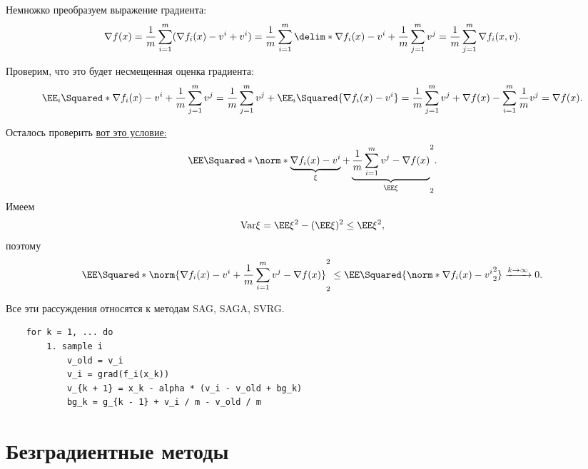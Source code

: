 Немножко преобразуем выражение градиента:
\begin{equation*}
    \nabla f(x) = \frac{1}{m}\sum_{i = 1}^m (\nabla f_i(x) - v^i + v^i) = \frac{1}{m}\sum_{i = 1}^m \delim*{\nabla f_i(x) - v^i + \frac{1}{m}\sum_{j = 1}^m v^j} = \frac{1}{m} \sum_{j = 1}^m \nabla f_i(x, v).
\end{equation*}

Проверим, что это будет несмещенная оценка градиента:
\begin{equation*}
    \EE_i \Squared*{\nabla f_i(x) - v^i + \frac{1}{m}\sum_{j = 1}^m v^j} = \frac{1}{m}\sum_{j = 1}^m v^j + \EE_i \Squared{\nabla f_i (x) - v^i} = \frac{1}{m}\sum_{j = 1}^m v^j + \nabla f(x) - \sum_{i = 1}^m \frac{1}{m}v^j = \nabla f(x).
\end{equation*}

Осталось проверить \hyperref[conv-cond]{вот это условие:}
\begin{equation*}
    \EE \Squared*{\norm*{\underbrace{\nabla f_i(x) - v^i}_{\xi} + \underbrace{\frac{1}{m}\sum_{i = 1}^m v^j - \nabla f(x)}_{\EE \xi}}_2^2}. 
\end{equation*}
Имеем
\begin{equation*}
    \mathrm{Var} \xi = \EE \xi^2 - (\EE \xi)^2 \leq \EE \xi^2,
\end{equation*}
поэтому
\begin{equation*}
    \EE \Squared*{\norm{\nabla f_i(x) - v^i + \frac{1}{m}\sum_{i = 1}^m v^j - \nabla f(x)}_2^2} \leq \EE\Squared{\norm*{\nabla f_i(x) - v^i}_2^2} \xrightarrow{k \to \infty} 0.
\end{equation*}

Все эти рассуждения относятся к методам SAG, SAGA, SVRG.

\begin{verbatim}
    for k = 1, ... do
        1. sample i
            v_old = v_i
            v_i = grad(f_i(x_k))
            v_{k + 1} = x_k - alpha * (v_i - v_old + bg_k)
            bg_k = g_{k - 1} + v_i / m - v_old / m
\end{verbatim}

\section{Безградиентные методы}

